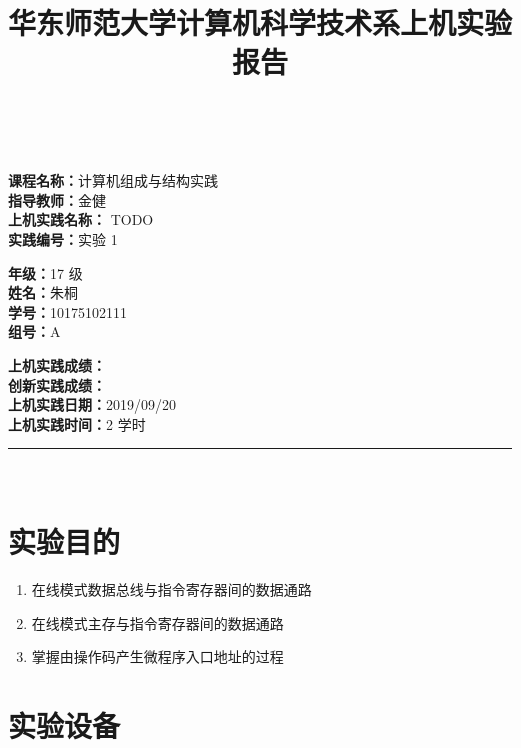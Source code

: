 \documentclass[a4paper,10pt,UTF8]{paper}
\title{华东师范大学计算机科学技术系上机实验报告}
\numberwithin{equation}{section}
\numberwithin{figure}{section}
\begin{document}
\pagestyle{fancy}
\lhead{}
\rhead{}
\makeatletter
\def\headrule{{\if@fancyplain\let\headrulewidth\plainheadrulewidth\fi%
\color{gray}\hrule\@height 0.2pt\@width\headwidth}
  \vspace{6mm}}
\makeatother

\newcommand{\HRule}{\rule{\linewidth}{1mm}}
\newcommand{\dai}{\textbf{Dais-CMX16$^+$}}

{ \\ [0.8cm]

\small{
  \begin{minipage}[t]{.32\linewidth}
    \textbf{课程名称：}计算机组成与结构实践\\
    \textbf{指导教师：}金健\\
    \textbf{上机实践名称：} TODO\\
    \textbf{实践编号：}实验 1
  \end{minipage}
  \begin{minipage}[t]{.32\linewidth}
    \textbf{年级：}17 级\\
    \textbf{姓名：}朱桐\\
    \textbf{学号：}10175102111\\
    \textbf{组号：}A
  \end{minipage} 
  \begin{minipage}[t]{.32\linewidth}
    \textbf{上机实践成绩：} \\
    \textbf{创新实践成绩：} \\
    \textbf{上机实践日期：}2019/09/20\\
    \textbf{上机实践时间：}2 学时\\
  \end{minipage}
}
\HRule \\[0.5cm]
}
\section{实验目的}

\begin{enumerate}
    \item 在线模式数据总线与指令寄存器间的数据通路
    \item 在线模式主存与指令寄存器间的数据通路
    \item 掌握由操作码产生微程序入口地址的过程
\end{enumerate}

\section{实验设备}
\end{document}
